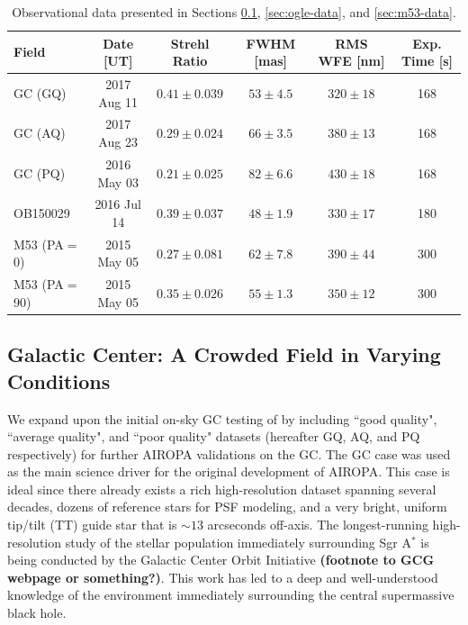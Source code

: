 \documentclass[]{spie}  %
\begin{document}
\begin{table}[!h]
\centering
\caption{Observational data presented in Sections \ref{sec:gc-data}, \ref{sec:ogle-data}, and \ref{sec:m53-data}.} \label{tab:fields-metrics}
\begin{tabular}{|l|c|c|c|c|c|}
\hline
        Field &  Date [UT] &  Strehl Ratio &  FWHM [mas] &  RMS WFE [nm] & Exp. Time [s] \\\hline\hline
        GC (GQ) &   2017 Aug 11 & $0.41 \pm 0.039$ & $53 \pm 4.5$ & $320 \pm 18$ & 168\\
        GC (AQ) &   2017 Aug 23 & $0.29 \pm 0.024$ & $66 \pm 3.5$ & $380 \pm 13$ & 168\\
        GC (PQ) &   2016 May 03 & $0.21 \pm 0.025$ & $82 \pm 6.6$ & $430 \pm 18$ & 168\\
        OB150029 &    2016 Jul 14 &  $0.39 \pm 0.037$ & $48 \pm 1.9$ & $330 \pm 17$ & 180\\
        M53 (PA$=$0) &   2015 May 05 &  $0.27 \pm 0.081$ & $62 \pm 7.8$ & $390 \pm 44$ & 300\\
        M53 (PA$=$90) &   2015 May 05 & $0.35 \pm 0.026$ & $55 \pm 1.3$ & $350 \pm 12$ & 300\\\hline
\end{tabular}
\end{table}

\subsection{Galactic Center: A Crowded Field in Varying Conditions} \label{sec:gc-data}
We expand upon the initial on-sky GC testing of \cite{Turri:inprep} by including ``good quality", ``average quality", and ``poor quality" datasets (hereafter GQ, AQ, and PQ respectively) for further AIROPA validations on the GC. The GC case was used as the main science driver for the original development of AIROPA. This case is ideal since there already exists a rich high-resolution dataset spanning several decades, dozens of reference stars for PSF modeling, and a very bright, uniform tip/tilt (TT) guide star that is ${\sim}13$ arcseconds off-axis. The longest-running high-resolution study of the stellar population immediately surrounding Sgr A$^{*}$ is being conducted by the Galactic Center Orbit Initiative \textbf{(footnote to GCG webpage or something?)}. This work has led to a deep and well-understood knowledge \citep{ghez:2005b, ghez:2008a, lu:2008a, do:2019a, gautam:2019a} of the environment immediately surrounding the central supermassive black hole.
\end{document}
